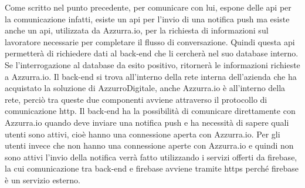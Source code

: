 \begin{trivlist}
	Come scritto nel punto precedente, per comunicare con lui, espone delle \gls{api}\ap{[g]} per la comunicazione infatti, esiste un \gls{api}\ap{[g]} per l'invio di una \gls{notifica push}\ap{[g]} ma esiste anche un \gls{api}\ap{[g]}, utilizzata da Azzurra.io, per la richiesta di informazioni sul lavoratore necessarie per completare il flusso di conversazione. Quindi questa \gls{api}\ap{[g]} permetterà di richiedere dati al back-end che li cercherà nel suo database interno. Se l'interrogazione al database da esito positivo, ritornerà le informazioni richieste a Azzurra.io. Il back-end si trova all'interno della rete interna dell'azienda che ha acquistato la soluzione di AzzurroDigitale, anche Azzurra.io è all'interno della rete, perciò tra queste due componenti avviene attraverso il protocollo di comunicazione \gls{http}\ap{[g]}\glsfirstoccur. Il back-end ha la possibilità di comunicare direttamente con Azzurra.io quando deve inviare una \gls{notifica push}\ap{[g]} e ha necessità di sapere quali utenti sono attivi, cioè hanno una connessione aperta con Azzurra.io. Per gli utenti invece che non hanno una connessione aperte con Azzurra.io e quindi non sono attivi l'invio della notifica verrà fatto utilizzando i servizi offerti da \gls{firebase}\ap{[g]}, la cui comunicazione tra back-end e \gls{firebase}\ap{[g]} avviene tramite \gls{https}\ap{[g]} perché \gls{firebase}\ap{[g]} è un servizio esterno.\\
	

\end{trivlist}
